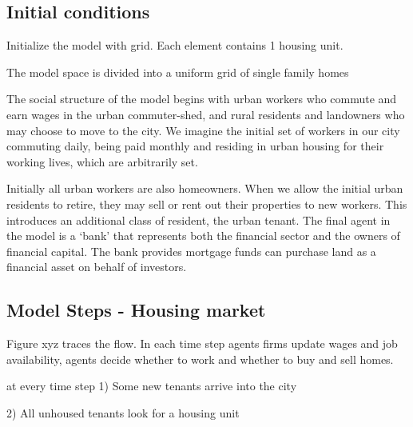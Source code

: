 \subsection{Initial conditions}
Initialize the model with grid. Each element contains 1 housing unit.

The model space is divided into a uniform grid of single family homes %

The social structure of the model begins with urban workers who commute and earn wages in the urban commuter-shed, and rural residents and landowners who may choose to move to the city. 
We imagine the initial set of workers in our city commuting daily, being paid monthly and residing in urban housing for their working lives, which are arbitrarily set. 

Initially all urban workers are also homeowners. When we allow the initial urban residents to retire, they may sell or rent out their properties to new workers. This introduces an additional \gls{class} of resident, the urban tenant. The final agent in the model is a `bank' that represents both the financial sector and the owners of financial capital. The bank provides mortgage funds can %
purchase land as a financial asset on behalf of investors.

\subsection{Model Steps - Housing market}
Figure xyz traces the flow. In each time step agents firms update wages and job availability, agents decide whether to work and whether to buy and sell homes.

at every time step 
    1) Some new tenants arrive into the city
    
    2) All unhoused tenants look for a housing unit 
    
